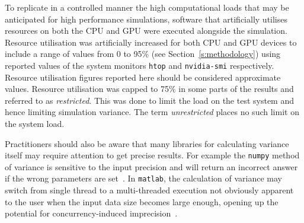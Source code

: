 \documentclass[letterpaper, 10 pt, journal, twoside]{IEEEtran}
\begin{document}
To replicate in a controlled manner the high computational loads that may be anticipated for high performance simulations, software that artificially utilises resources on both the CPU and GPU were executed alongside the simulation. 
%
Resource utilisation was artificially increased for both CPU and GPU devices to include a range of values from 0 to 95\% (see Section~\ref{s:methodology}) using reported values of the system monitors \texttt{htop} and \texttt{nvidia-smi} respectively. Resource utilisation figures reported here should be considered approximate values. %
Resource utilisation was capped to 75\% in some parts of the results and referred to as \textit{restricted}. This was done to limit the load on the test system and hence limiting simulation variance. The term \textit{unrestricted} places no such limit on the system load.

%
%


Practitioners should also be aware that many libraries for calculating variance itself may require attention to get precise results. For example the \texttt{numpy} method of variance is sensitive to the input precision and will return an incorrect answer if the wrong parameters are set~\cite{NumpyVar}. In \texttt{matlab}, the calculation of variance may switch from single thread to a multi-threaded execution not obviously apparent to the user when the input data size becomes large enough, opening up the potential for concurrency-induced imprecision~\cite{matlab_parallel_computing}. 
\end{document}
